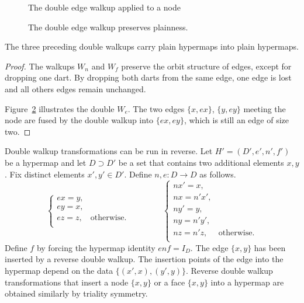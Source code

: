 \begin{figure}[htb]
\centering
{}
\caption{The double edge walkup applied to a node}
\label{fig:doubleedge}
\end{figure}

\begin{figure}[htb]
\centering
{}
\caption{The double edge walkup preserves plainness.}
\label{fig:doubleplain}
\end{figure}


\begin{lemma}  
The three preceding double walkups carry plain
hypermaps into plain hypermaps.
\end{lemma}
%

\begin{proof} The walkups $W_n$ and $W_f$ preserve the orbit structure
of edges, except for dropping one dart.  By dropping both darts from
the same edge, one edge is lost and all others edges remain
unchanged.

Figure~\ref{fig:doubleplain} illustrates the double $W_e$.  The two
edges $\{x,e x\}$, $\{y, e y\}$ meeting the node are fused by the
double walkup into $\{e x, e y\}$, which is still an edge of size
two.
\end{proof}

\begin{remark}\label{rem:reverse-double-walkup}
Double walkup transformations can be run in reverse.
Let $H'=(D',e',n',f')$ be
a hypermap and let $D\supset D'$ be a set that contains two additional elements
$x,y$.  Fix distinct elements $x',y'\in D'$.  Define $n,e:D\to D$ as follows.
\begin{displaymath}
\begin{cases} 
e x = y, &\\
e y = x,&\\
e z = z,&\text{otherwise.}\\
\end{cases}
\qquad\qquad
\begin{cases} 
n x' = x, &\\
n x =  n' x',&\\
n y' = y,&\\
n y =  n' y',&\\
n z = n' z, &\text{otherwise.}\\
\end{cases}
\end{displaymath}
Define $f$ by forcing the hypermap identity $e n f = I_D$.  
The edge $\{x,y\}$ has been inserted by a reverse double walkup.  The insertion points of the edge
into the hypermap
depend on the data $\{(x',x),(y',y)\}$.   Reverse double walkup transformations that
insert a node $\{x,y\}$ or a face $\{x,y\}$ into a hypermap are obtained similarly  by triality symmetry.
%
\end{remark}



